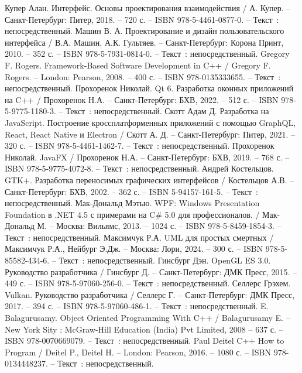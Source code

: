 
\begin{thebibliography}{20}
	 Купер Алан. Интерфейс. Основы проектирования взаимодействия / А. Купер. – Санкт-Петербург: Питер, 2018. – 720 с. – ISBN 978-5-4461-0877-0. – Текст~: непосредственный.
	 Машин В. А. Проектирование и дизайн пользовательского интерфейса / В.А. Машин, А.К. Гультяев. – Санкт-Петербург: Корона Принт, 2010. – 352 с. – ISBN 978-5-7931-0814-0. – Текст~: непосредственный.
	 Gregory F. Rogers. Framework-Based Software Development in C++  / Gregory F. Rogers. – London: Pearson, 2008. – 400 с. – ISBN 978-0135333655. – Текст~: непосредственный.
	 Прохоренок Николай. Qt 6. Разработка оконных приложений на C++ / Прохоренок Н.А. – Санкт-Петербург: БХВ, 2022. – 512 с. – ISBN 978-5-9775-1180-3. – Текст~: непосредственный.
	 Скотт Адам Д. Разработка на JavaScript. Построение кроссплатформенных приложений с помощью GraphQL, React, React Native и Electron / Скотт А. Д. – Санкт-Петербург: Питер, 2021. – 320 с. – ISBN 978-5-4461-1462-7. – Текст~: непосредственный.
	 Прохоренок Николай. JavaFX / Прохоренок Н.А. – Санкт-Петербург: БХВ, 2019. – 768 с. – ISBN 978-5-9775-4072-8. – Текст~: непосредственный.
	 Андрей Костельцов. GTK+. Разработка переносимых графических интерфейсов / Костельцов А.В. – Санкт-Петербург: БХВ, 2002. – 362 с. – ISBN 5-94157-161-5. – Текст~: непосредственный.
	 Мак-Дональд Мэтью. WPF: Windows Presentation Foundation в .NET 4.5 с примерами на C{\#} 5.0 для профессионалов. / Мак-Дональд М. – Москва: Вильямс, 2013. – 1024 с. – ISBN 978-5-8459-1854-3. – Текст~: непосредственный.
	 Максимчук Р.А. UML для простых смертных /Максимчук  Р.А., Нейбург Э.Дж. – Москва: Лори, 2024. – 300 с. – ISBN 978-5-85582-434-6. – Текст~: непосредственный.
	 Гинсбург Дэн. OpenGL ES 3.0. Руководство разработчика / Гинсбург Д. – Санкт-Петербург: ДМК Пресс, 2015. – 449 с. – ISBN 978-5-97060-256-0. – Текст~: непосредственный.
	 Селлерс Грэхем. Vulkan. Руководство разработчика / Селлерс Г. – Санкт-Петербург: ДМК Пресс, 2017. – 394 с. – ISBN 978-5-97060-486-1. – Текст~: непосредственный.
     E. Balagurusamy. Object Oriented Programming With C++ / Balagurusamy E.  – New York Sity : McGraw-Hill Education (India) Pvt Limited, 2008 – 637 с. – ISBN 978-0070669079. – Текст~: непосредственный.
     Paul Deitel C++ How to Program / Deitel P., Deitel H. – London: Pearson, 2016. – 1080 с. – ISBN 978-0134448237. – Текст~: непосредственный.

\end{thebibliography}
